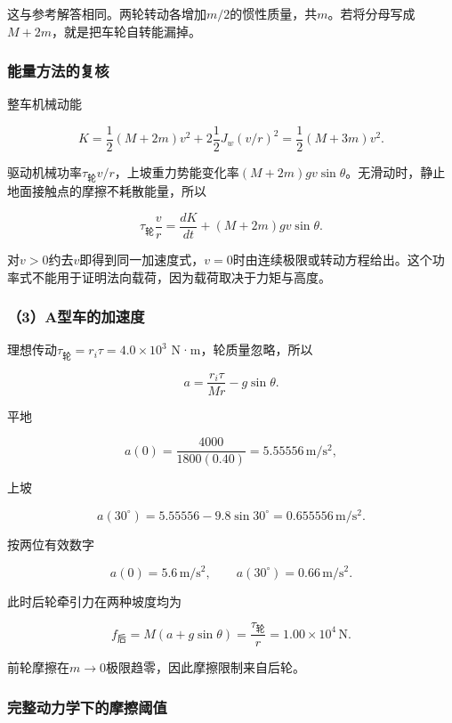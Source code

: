 \documentclass[12pt,a4paper,fontset=fandol]{ctexart}
\begin{document}
这与参考解答相同。两轮转动各增加\(m/2\)的惯性质量，共\(m\)。若将分母写成\(M+2m\)，就是把车轮自转能漏掉。

\subsubsection{能量方法的复核}\label{ux80fdux91cfux65b9ux6cd5ux7684ux590dux6838}

整车机械动能

\[
K=\frac12(M+2m)v^2
+2\frac12J_w(v/r)^2
=\frac12(M+3m)v^2.
\]

驱动机械功率\(\tau_{\text{轮}}v/r\)，上坡重力势能变化率\((M+2m)g v\sin\theta\)。无滑动时，静止地面接触点的摩擦不耗散能量，所以

\[
\tau_{\text{轮}}\frac vr
=\frac{dK}{dt}+(M+2m)g v\sin\theta.
\]

对\(v>0\)约去\(v\)即得到同一加速度式，\(v=0\)时由连续极限或转动方程给出。这个功率式不能用于证明法向载荷，因为载荷取决于力矩与高度。

\subsubsection{（3）A型车的加速度}\label{aux578bux8f66ux7684ux52a0ux901fux5ea6}

理想传动\(\tau_{\text{轮}}=r_i\tau=4.0\times10^3\) N·m，轮质量忽略，所以

\[
a=\frac{r_i\tau}{Mr}-g\sin\theta.
\]

平地

\[
a(0)=\frac{4000}{1800(0.40)}
=5.55556\,\mathrm{m/s^2},
\]

上坡

\[
a(30^\circ)=5.55556-9.8\sin30^\circ
=0.655556\,\mathrm{m/s^2}.
\]

按两位有效数字

\[
\boxed{a(0)=5.6\,\mathrm{m/s^2},\qquad
a(30^\circ)=0.66\,\mathrm{m/s^2}}.
\]

此时后轮牵引力在两种坡度均为

\[
f_{\text{后}}=M(a+g\sin\theta)
=\frac{\tau_{\text{轮}}}r=1.00\times10^4\,\mathrm N.
\]

前轮摩擦在\(m\to0\)极限趋零，因此摩擦限制来自后轮。

\subsubsection{完整动力学下的摩擦阈值}\label{ux5b8cux6574ux52a8ux529bux5b66ux4e0bux7684ux6469ux64e6ux9608ux503c}
\end{document}
